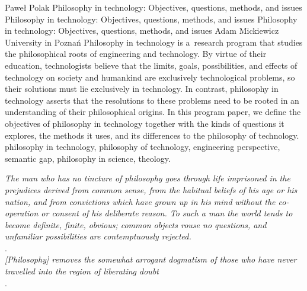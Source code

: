 \begin{artengenv}{Paweł Polak}
	{Philosophy in technology: Objectives, questions, methods, and issues}
	{Philosophy in technology: Objectives, questions, methods, and issues}
	{Philosophy in technology: Objectives, questions, methods, and issues}
	{Adam Mickiewicz University in Poznań}
	{Philosophy in technology is a~research program that studies the philosophical roots of engineering and technology. By virtue of their education, technologists believe that the limits, goals, possibilities, and effects of technology on society and humankind are exclusively technological problems, so their solutions must lie exclusively in technology. In contrast, philosophy in technology asserts that the resolutions to these problems need to be rooted in an understanding of their philosophical origins. In this program paper, we define the objectives of philosophy in technology together with the kinds of questions it explores, the methods it uses, and its differences to the philosophy of technology. \enlargethispage{2.5\baselineskip}
	}
	{philosophy in technology, philosophy of technology, engineering perspective, semantic gap, philosophy in science, theology.}


\begin{customepigraph}
\textit{The man who has no tincture of philosophy goes through life imprisoned in the prejudices derived from common sense, from the habitual beliefs of his age or his nation, and from convictions which have grown up in his mind without the co-operation or consent of his deliberate reason. To such a man the world tends to become definite, finite, obvious; common objects rouse no questions, and unfamiliar possibilities are contemptuously rejected.} \\
\parencite[][p.243]{russell_problems_1912}. \\

\noindent\textit{[Philosophy] removes the somewhat arrogant dogmatism of those who have never travelled into the region of liberating doubt} \\
\parencite[][pp.243–244]{russell_problems_1912}. \\
\end{customepigraph}




\end{artengenv}
